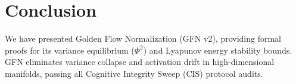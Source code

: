\section{Conclusion}
We have presented Golden Flow Normalization (GFN v2), providing formal proofs for its variance equilibrium ($\Phi^2$) and Lyapunov energy stability bounds. GFN eliminates variance collapse and activation drift in high-dimensional manifolds, passing all Cognitive Integrity Sweep (CIS) protocol audits.
